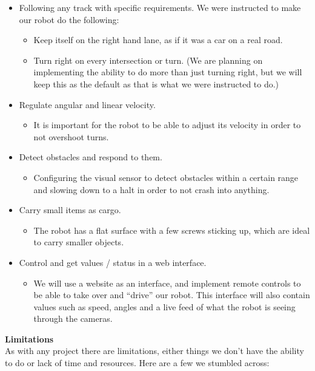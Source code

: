 \documentclass[11pt]{article}
\begin{document}
\begin{itemize}
    \item Following any track with specific requirements. We were instructed to make our robot do the following: \begin{itemize}
        \item Keep itself on the right hand lane, as if it was a car on a real road.
        \item Turn right on every intersection or turn. (We are planning on implementing the ability to do more than just turning right, but we will keep this as the default as that is what we were instructed to do.)
    \end{itemize} 
    \item Regulate angular and linear velocity. \begin{itemize}
        \item It is important for the robot to be able to adjust its velocity in order to not overshoot turns.
    \end{itemize}
    \item Detect obstacles and respond to them. \begin{itemize}
        \item Configuring the visual sensor to detect obstacles within a certain range and slowing down to a halt in order to not crash into anything. 
    \end{itemize}
    \item Carry small items as cargo. \begin{itemize}
        \item The robot has a flat surface with a few screws sticking up, which are ideal to carry smaller objects.
    \end{itemize}
    \item Control and get values / status in a web interface. \begin{itemize}
        \item We will use a website as an interface, and implement remote controls to be able to take over and “drive” our robot. This interface will also contain values such as speed, angles and a live feed of what the robot is seeing through the cameras. 
    \end{itemize}
\end{itemize}
\textbf{Limitations}
\\
As with any project there are limitations, either things we don’t have the ability to do or lack of time and resources. Here are a few we stumbled across: 
\end{document}
